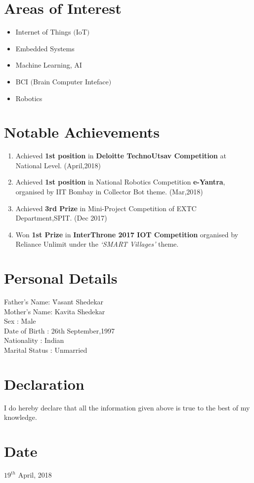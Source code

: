 \documentclass[margin]{res}
\begin{document}
\begin{resume}
\section{Areas of Interest}
\begin{itemize}
\item Internet of Things $($IoT$)$
\item Embedded Systems
\item Machine Learning, AI
\item BCI $($Brain Computer Inteface$)$
\item Robotics
\end{itemize}

\section{Notable Achievements}
\begin{enumerate}
\item Achieved \textbf{1st position} in \textbf{Deloitte TechnoUtsav Competition} at National Level. \hfill   (April,2018)
\item Achieved \textbf{1st position} in National Robotics Competition \textbf{e-Yantra}, organised by IIT Bombay in Collector Bot theme. \hfill   (Mar,2018)
\item Achieved \textbf{3rd Prize} in Mini-Project Competition of EXTC Department,SPIT. \hfill        (Dec 2017)
\item Won \textbf{1st Prize}  in \textbf{InterThrone 2017  IOT Competition} organised by Reliance Unlimit under the \textit{‘SMART Villages’} theme.    


\end{enumerate}

\section{Personal Details}
\begin{tabbing}
Father's Name: \hspace{1em} \= Vasant Shedekar \\
Mother's Name: \>  Kavita Shedekar \\
Sex : \> Male \\
Date of Birth : \>  26th September,1997 \\
Nationality :  \> Indian \\
Marital Status :  \> Unmarried \\
\end{tabbing}

\section{Declaration}
I do hereby declare that all the information given above is true to the best of 
my knowledge.

\section{Date}
$19^{th}$ April, 2018


\end{resume}
\end{document}
